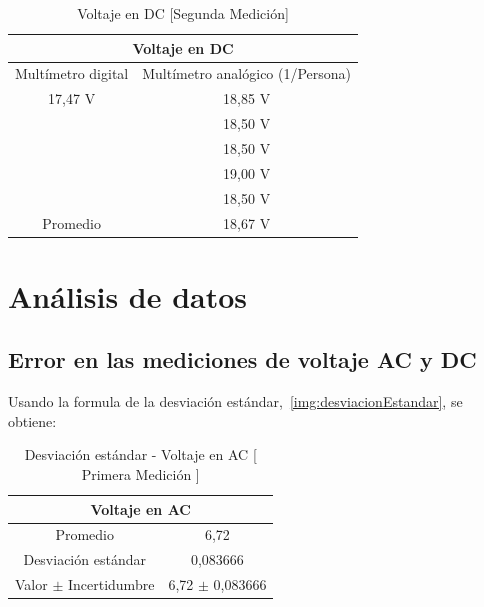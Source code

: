 \documentclass[letterpaper, 12pt]{report}
\begin{document}
\begin{table}[H]
	\begin{center}
		\begin{tabular}{|c|c|}
			\multicolumn{2}{c}{Voltaje en DC}                     \\ \hline
			Multímetro digital & Multímetro analógico (1/Persona) \\ \hline
			17,47 V            & 18,85 V                          \\
			                   & 18,50 V                          \\
			                   & 18,50 V                          \\
			                   & 19,00 V                          \\
			                   & 18,50 V                          \\ \hline
			Promedio           & 18,67 V                          \\ \hline
		\end{tabular}
		\caption{Voltaje en DC [Segunda Medición]}
		\label{tab:voltajeDC_2}
	\end{center}
\end{table}

\section{Análisis de datos}

\subsection{Error en las mediciones de voltaje AC y DC}

Usando la formula de la desviación estándar,~\ref{img:desviacionEstandar},
se obtiene:

\begin{table}[H]
	\begin{center}
		\begin{tabular}{|c|c|}
			\multicolumn{2}{c}{Voltaje en AC}               \\ \hline
			Promedio                  & 6,72                \\ \hline
			Desviación estándar       & 0,083666            \\ \hline
			Valor $\pm$ Incertidumbre & 6,72 $\pm$ 0,083666 \\ \hline
		\end{tabular}
		\caption{Desviación estándar - Voltaje en AC [ Primera Medición ]}
	\end{center}
\end{table}
\end{document}
